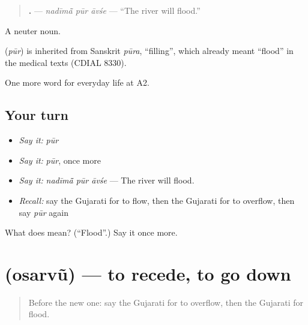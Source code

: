 \begin{quote}
\textbf{  .} — \emph{nadīmā̃ pūr āvśe} — \textquotedblleft{}The river will flood.\textquotedblright{}
\end{quote}

A neuter noun.

\begin{cousinweb}
\textbf{} (\emph{pūr}) is inherited from Sanskrit \emph{pūra}, \textquotedblleft{}filling\textquotedblright{}, which already meant \textquotedblleft{}flood\textquotedblright{} in the medical texts (CDIAL 8330).
\end{cousinweb}

\begin{grammarlens}[title={What you've built}]
One more word for everyday life at A2.
\end{grammarlens}

\subsection*{Your turn}
\begin{itemize}
\raggedright
  \item \emph{Say it:} \emph{pūr}
  \item \emph{Say it:} \emph{pūr}, once more
  \item \emph{Say it:} \emph{nadīmā̃ pūr āvśe} — The river will flood.
  \item \emph{Recall:} say the Gujarati for to flow, then the Gujarati for to overflow, then say \emph{pūr} again
\end{itemize}

\begin{tcolorbox}[breakable,colback=teal!4,colframe=teal!35!black,title={Before you move on}]
What does  mean? (\textquotedblleft{}Flood\textquotedblright{}.) Say it once more.
\end{tcolorbox}
\section[\texorpdfstring{\gu{ઓસરવું} (osarvũ)}{ઓસરવું (osarvũ)}]{ (osarvũ) — to recede, to go down}

\label{lesson:GU-C220-osarvu}



\begin{quote}
Before the new one: say the Gujarati for to overflow, then the Gujarati for flood.
\end{quote}

